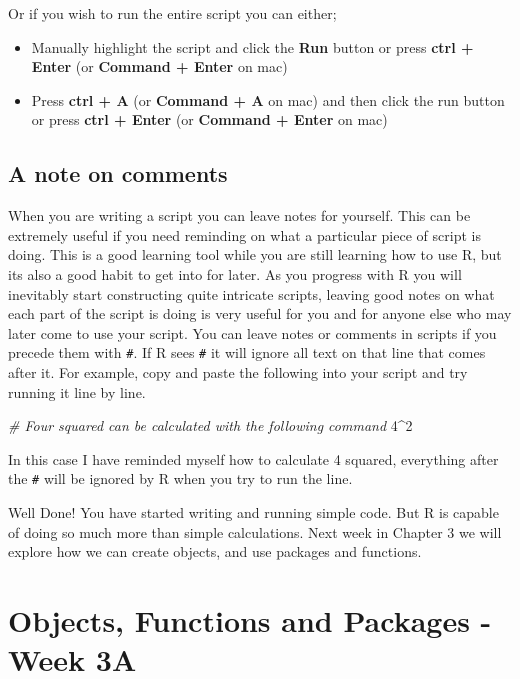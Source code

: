 \documentclass[
]{book}
\newenvironment{Shaded}{\begin{snugshade}}{\end{snugshade}}
\newcommand{\CommentTok}[1]{\textcolor[rgb]{0.56,0.35,0.01}{\textit{#1}}}
\newcommand{\DecValTok}[1]{\textcolor[rgb]{0.00,0.00,0.81}{#1}}
\newcommand{\SpecialCharTok}[1]{\textcolor[rgb]{0.81,0.36,0.00}{\textbf{#1}}}
\providecommand{\tightlist}{%
  \setlength{\itemsep}{0pt}\setlength{\parskip}{0pt}}
\begin{document}
Or if you wish to run the entire script you can either;

\begin{itemize}
\tightlist
\item
  Manually highlight the script and click the \textbf{Run} button or press \textbf{ctrl + Enter} (or \textbf{Command + Enter} on mac)
\item
  Press \textbf{ctrl + A} (or \textbf{Command + A} on mac) and then click the run button or press \textbf{ctrl + Enter} (or \textbf{Command + Enter} on mac)
\end{itemize}

\hypertarget{a-note-on-comments}{%
\section{A note on comments}\label{a-note-on-comments}}

When you are writing a script you can leave notes for yourself. This can be extremely useful if you need reminding on what a particular piece of script is doing. This is a good learning tool while you are still learning how to use R, but its also a good habit to get into for later. As you progress with R you will inevitably start constructing quite intricate scripts, leaving good notes on what each part of the script is doing is very useful for you and for anyone else who may later come to use your script. You can leave notes or comments in scripts if you precede them with \texttt{\#}. If R sees \texttt{\#} it will ignore all text on that line that comes after it. For example, copy and paste the following into your script and try running it line by line.

\begin{Shaded}
\begin{Highlighting}[]
\CommentTok{\# Four squared can be calculated with the following command}
\DecValTok{4}\SpecialCharTok{\^{}}\DecValTok{2}
\end{Highlighting}
\end{Shaded}

In this case I have reminded myself how to calculate 4 squared, everything after the \texttt{\#} will be ignored by R when you try to run the line.

Well Done! You have started writing and running simple code. But R is capable of doing so much more than simple calculations. Next week in Chapter 3 we will explore how we can create objects, and use packages and functions.

\hypertarget{objects-functions-and-packages---week-3a}{%
\chapter{Objects, Functions and Packages - Week 3A}\label{objects-functions-and-packages---week-3a}}
\end{document}
